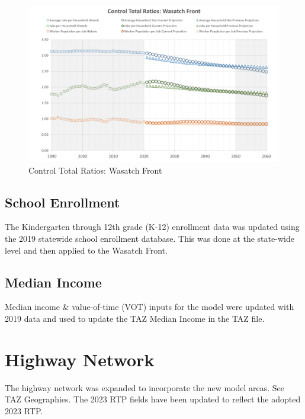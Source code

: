\documentclass[
  letterpaper,
  DIV=11,
  numbers=noendperiod,
  titlepage=false]{scrreprt}
\begin{document}
\begin{figure}[H]

{\centering \includegraphics{v9x/v900/whats-new/_pictures/pdf-ratio-control.png}

}

\caption{\label{fig-pdf-bus-rat-control}Control Total Ratios: Wasatch
Front}

\end{figure}

\hypertarget{school-enrollment}{%
\subsection{School Enrollment}\label{school-enrollment}}

The Kindergarten through 12th grade (K-12) enrollment data was updated
using the 2019 statewide school enrollment database. This was done at
the state-wide level and then applied to the Wasatch Front.

\hypertarget{median-income}{%
\subsection{Median Income}\label{median-income}}

Median income \& value-of-time (VOT) inputs for the model were updated
with 2019 data and used to update the TAZ Median Income in the TAZ file.

\hypertarget{highway-network}{%
\section{Highway Network}\label{highway-network}}

The highway network was expanded to incorporate the new model areas. See
TAZ Geographies. The 2023 RTP fields have been updated to reflect the
adopted 2023 RTP.
\end{document}
